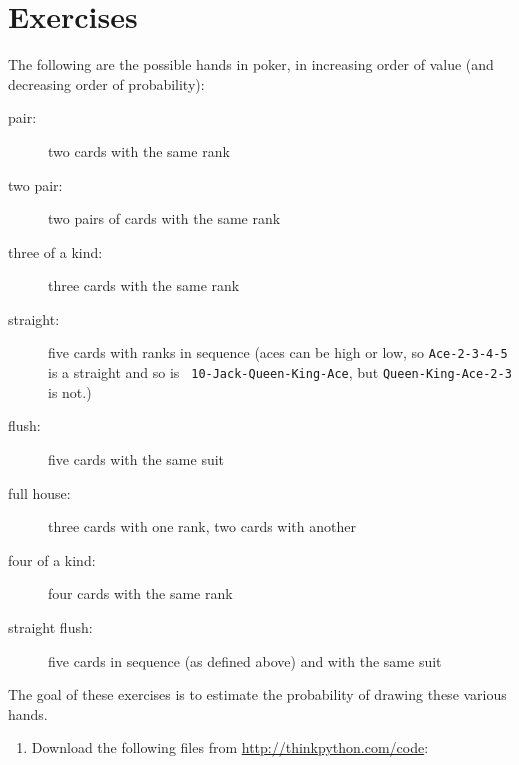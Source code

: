 \documentclass[10pt]{book}
\begin{document}
\section{Exercises}

\begin{exercise}
\label{poker}

The following are the possible hands in poker, in increasing order
of value (and decreasing order of probability):

\begin{description}

\item[pair:] two cards with the same rank
\vspace{-0.05in}

\item[two pair:] two pairs of cards with the same rank
\vspace{-0.05in}

\item[three of a kind:] three cards with the same rank
\vspace{-0.05in}

\item[straight:] five cards with ranks in sequence (aces can
be high or low, so {\tt Ace-2-3-4-5} is a straight and so is {\tt
10-Jack-Queen-King-Ace}, but {\tt Queen-King-Ace-2-3} is not.)
\vspace{-0.05in}

\item[flush:] five cards with the same suit
\vspace{-0.05in}

\item[full house:] three cards with one rank, two cards with another
\vspace{-0.05in}

\item[four of a kind:] four cards with the same rank
\vspace{-0.05in}

\item[straight flush:] five cards in sequence (as defined above) and
with the same suit
\vspace{-0.05in}

\end{description}
%
The goal of these exercises is to estimate
the probability of drawing these various hands.

\begin{enumerate}

\item Download the following files from \url{http://thinkpython.com/code}:


\end{enumerate}
\end{exercise}
\end{document}
